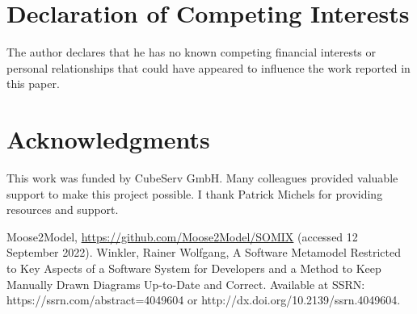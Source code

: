 \documentclass[preprint,12pt]{elsarticle}
\begin{document}
\section*{Declaration of Competing Interests} 
The author declares that he has no known competing financial interests or personal relationships that could have appeared to influence the work reported in this paper.



\section*{Acknowledgments}

This work was funded by CubeServ GmbH.
Many colleagues provided valuable support to make this project possible.
I thank
Patrick Michels for providing resources and support.



\begin{thebibliography}{00}

Moose2Model, \url{https://github.com/Moose2Model/SOMIX} (accessed 12 September 2022).
Winkler, Rainer Wolfgang, A Software Metamodel Restricted to Key Aspects of a Software System for Developers and a Method to Keep Manually Drawn Diagrams Up-to-Date and Correct. Available at SSRN: https://ssrn.com/abstract=4049604 or http://dx.doi.org/10.2139/ssrn.4049604.


\end{thebibliography}
\end{document}
